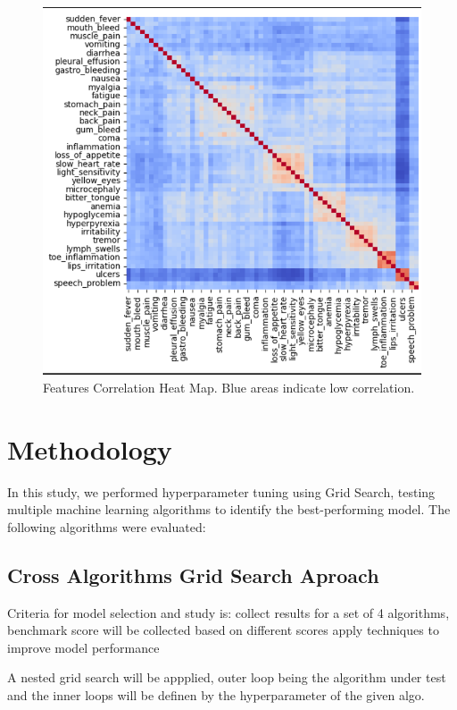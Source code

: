 \documentclass{article}
\begin{document}
\begin{figure}[H]  
\centering
\includegraphics[width=1\linewidth]{CorrelationMatrix.png}
\caption{Features Correlation Heat Map. Blue areas indicate low correlation.}
\vspace{-1em} %
\end{figure}

\section{Methodology}
In this study, we performed hyperparameter tuning using Grid Search, testing multiple machine learning algorithms to identify the best-performing model. The following algorithms were evaluated:

\subsection{Cross Algorithms Grid Search Aproach}

Criteria for model selection and study is: collect results for a set of 4 algorithms, benchmark score will be collected based
on different scores apply techniques to improve model performance

A nested grid search will be appplied, outer loop being the algorithm under test and the inner loops will 
be definen by the hyperparameter of the given algo.
\end{document}
